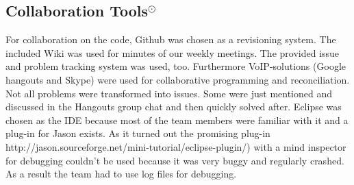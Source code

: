 \subsection[Collaboration Tools]{Collaboration Tools$^\odot$}
For collaboration on the code, Github was chosen as a revisioning system.
The included Wiki was used for minutes of our weekly meetings.
The provided issue and problem tracking system was used, too.
Furthermore VoIP-solutions (Google hangouts and Skype) were used for collaborative programming and reconciliation.
Not all problems were transformed into issues.
Some were just mentioned and discussed in the Hangouts group chat and then quickly solved after.
Eclipse was chosen as the IDE because most of the team members were familiar with it and a plug-in for Jason exists.
As it turned out the promising plug-in http://jason.sourceforge.net/mini-tutorial/eclipse-plugin/) with a mind inspector for debugging couldn't be used because it was very buggy and regularly crashed.
As a result the team had to use log files for debugging.

